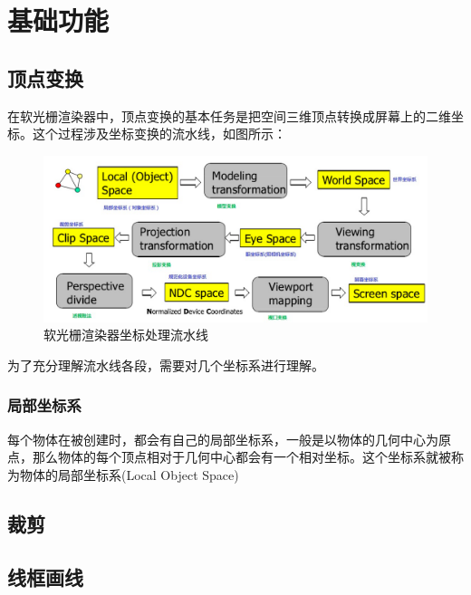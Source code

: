 

    \chapter{基础功能}

    \section{顶点变换}
    \begin{spacing}{2.5}
    在软光栅渲染器中，顶点变换的基本任务是把空间三维顶点转换成屏幕上的二维坐标。这个过程涉及坐标变换的流水线，如图所示：\\
    \begin{figure}[H]
		\centering
		\includegraphics[width=1.0\textwidth]{images/pipline.png}
		\caption{软光栅渲染器坐标处理流水线}
		\label{line}
		\end{figure}
    \end{spacing}

    为了充分理解流水线各段，需要对几个坐标系进行理解。
    \subsection{局部坐标系}
    \begin{spacing}{2.5}
    每个物体在被创建时，都会有自己的局部坐标系，一般是以物体的几何中心为原点，那么物体的每个顶点相对于几何中心都会有一个相对坐标。这个坐标系就被称为物体的局部坐标系(Local Object Space)	
    \end{spacing}

    \section{裁剪}
    \section{线框画线}

